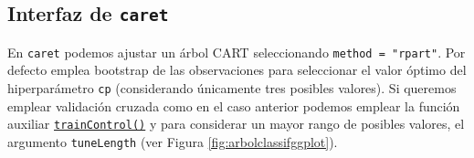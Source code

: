 \documentclass[
]{book}
\newenvironment{Shaded}{\begin{snugshade}}{\end{snugshade}}
\newcommand{\AttributeTok}[1]{\textcolor[rgb]{0.77,0.63,0.00}{#1}}
\newcommand{\CommentTok}[1]{\textcolor[rgb]{0.56,0.35,0.01}{\textit{#1}}}
\newcommand{\DecValTok}[1]{\textcolor[rgb]{0.00,0.00,0.81}{#1}}
\newcommand{\FunctionTok}[1]{\textcolor[rgb]{0.00,0.00,0.00}{#1}}
\newcommand{\NormalTok}[1]{#1}
\newcommand{\OtherTok}[1]{\textcolor[rgb]{0.56,0.35,0.01}{#1}}
\newcommand{\SpecialCharTok}[1]{\textcolor[rgb]{0.00,0.00,0.00}{#1}}
\newcommand{\StringTok}[1]{\textcolor[rgb]{0.31,0.60,0.02}{#1}}
\theoremstyle{break}
\theoremstyle{nonumberplain}
\renewcommand{\CommentTok}[1]{\textcolor[rgb]{0.41,0.41,0.41}{\texttt{#1}}}
\begin{document}
\hypertarget{interfaz-de-caret}{%
\subsection{\texorpdfstring{Interfaz de \texttt{caret}}{Interfaz de caret}}\label{interfaz-de-caret}}

En \texttt{caret} podemos ajustar un árbol CART seleccionando \texttt{method\ =\ "rpart"}.
Por defecto emplea bootstrap de las observaciones para seleccionar el valor óptimo del hiperparámetro \texttt{cp} (considerando únicamente tres posibles valores).
Si queremos emplear validación cruzada como en el caso anterior podemos emplear la función auxiliar \href{https://rdrr.io/pkg/caret/man/trainControl.html}{\texttt{trainControl()}} y para considerar un mayor rango de posibles valores, el argumento \texttt{tuneLength} (ver Figura \ref{fig:arbolclassifggplot}).

\begin{Shaded}
\end{Shaded}
\end{document}
